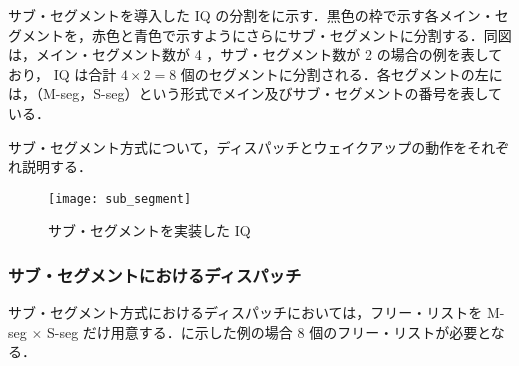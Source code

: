 サブ・セグメントを導入した IQ の分割をに示す．黒色の枠で示す各メイン・セグメントを，赤色と青色で示すようにさらにサブ・セグメントに分割する．同図は，メイン・セグメント数が 4 ，サブ・セグメント数が 2 の場合の例を表しており， IQ は合計 $4 \times 2 = 8$ 個のセグメントに分割される．各セグメントの左には，（M-seg，S-seg）という形式でメイン及びサブ・セグメントの番号を表している．

サブ・セグメント方式について，ディスパッチとウェイクアップの動作をそれぞれ説明する．

\begin{figure}[htb]
  \centering
  \texttt{[image: sub\_segment]}
  \caption{サブ・セグメントを実装した IQ}
  \label{fig:sub_segment}
\end{figure}

\subsubsection{サブ・セグメントにおけるディスパッチ}
サブ・セグメント方式におけるディスパッチにおいては，フリー・リストを M-seg $\times$ S-seg だけ用意する．に示した例の場合 8 個のフリー・リストが必要となる．

